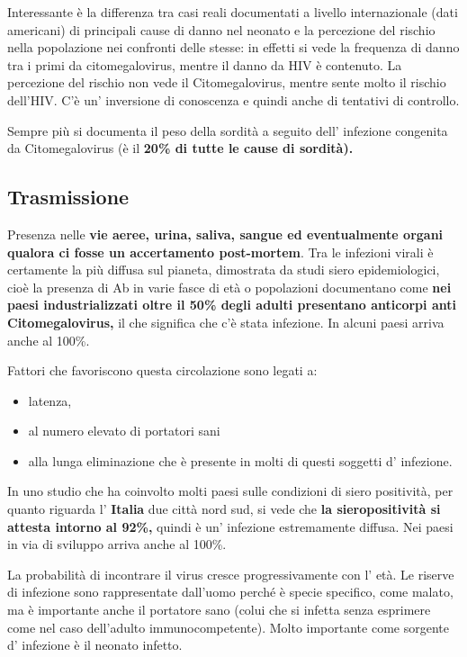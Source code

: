   Interessante è la differenza tra casi reali documentati a livello
  internazionale (dati americani) di principali cause di danno nel
  neonato e la percezione del rischio nella popolazione nei confronti
  delle stesse: in effetti si vede la frequenza di danno tra i primi da
  citomegalovirus, mentre il danno da HIV è contenuto. La percezione del
  rischio non vede il Citomegalovirus, mentre sente molto il rischio
  dell'HIV. C'è un' inversione di conoscenza e quindi anche di tentativi
  di controllo.

  Sempre più si documenta il peso della sordità a seguito dell'
  infezione congenita da Citomegalovirus (è il \textbf{20\% di tutte le
  cause di sordità).}

\subsection{Trasmissione}
  Presenza nelle \textbf{vie aeree, urina, saliva, sangue ed
  eventualmente organi qualora ci fosse un accertamento post-mortem}.
  Tra le infezioni virali è certamente la più diffusa sul pianeta,
  dimostrata da studi siero epidemiologici, cioè la presenza di Ab in
  varie fasce di età o popolazioni documentano come \textbf{nei paesi
  industrializzati oltre il 50\% degli adulti presentano anticorpi anti
  Citomegalovirus,} il che significa che c'è stata infezione. In alcuni
  paesi arriva anche al 100\%.

  Fattori che favoriscono questa circolazione sono legati a:
  \begin{itemize}
  
\item
  latenza,
\item
  al numero elevato di portatori sani
\item
  alla lunga eliminazione che è presente in molti di questi soggetti d'
  infezione.
\end{itemize}
  In uno studio che ha coinvolto molti paesi sulle condizioni di siero
  positività, per quanto riguarda l' \textbf{Italia} due città nord sud,
  si vede che \textbf{la sieropositività si attesta intorno al 92\%,}
  quindi è un' infezione estremamente diffusa. Nei paesi in via di
  sviluppo arriva anche al 100\%.

  La probabilità di incontrare il virus cresce progressivamente con l'
  età. Le riserve di infezione sono rappresentate dall'uomo perché è
  specie specifico, come malato, ma è importante anche il portatore sano
  (colui che si infetta senza esprimere come nel caso dell'adulto
  immunocompetente). Molto importante come sorgente d' infezione è il
  neonato infetto.

